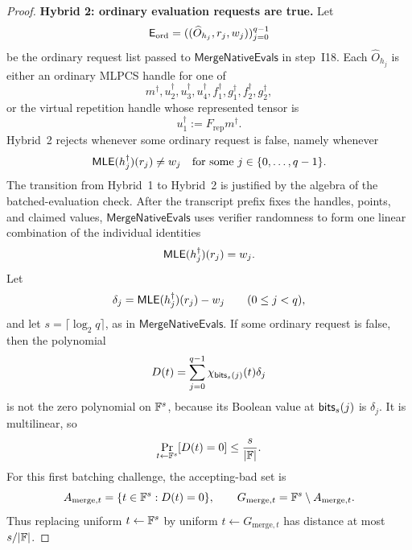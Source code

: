 \begin{proof}
\smallskip\noindent\textbf{Hybrid 2: ordinary evaluation requests are true.}
Let
\[
  \mathsf{E}_{\mathrm{ord}}
  =
  ((\widehat O_{h_j},r_j,w_j))_{j=0}^{q-1}
\]
be the ordinary request list passed to \(\mathsf{MergeNativeEvals}\) in
step~I18.  Each \(\widehat O_{h_j}\) is either an ordinary MLPCS handle for one
of
\[
  m^\dagger,u_2^\dagger,u_3^\dagger,u_4^\dagger,
  f_1^\dagger,g_1^\dagger,f_2^\dagger,g_2^\dagger,
\]
or the virtual repetition handle whose represented tensor is
\[
  u_1^\dagger:=F_{\mathrm{rep}}m^\dagger.
\]
Hybrid~2 rejects whenever some ordinary request is false, namely whenever
\[
  \mathsf{MLE}(h_j^\dagger)(r_j)\ne w_j
  \quad\text{for some }j\in\{0,\ldots,q-1\}.
\]
The transition from Hybrid~1 to Hybrid~2 is justified by the algebra of the
batched-evaluation check.  After the transcript prefix fixes the handles,
points, and claimed values, \(\mathsf{MergeNativeEvals}\) uses verifier
randomness to form one linear combination of the individual identities
\[
  \mathsf{MLE}(h_j^\dagger)(r_j)=w_j.
\]
Let
\[
  \delta_j=\mathsf{MLE}(h_j^\dagger)(r_j)-w_j
  \qquad(0\le j<q),
\]
and let \(s=\lceil\log_2 q\rceil\), as in
\(\mathsf{MergeNativeEvals}\).  If some ordinary request is false, then the
polynomial
\[
  D(t)=\sum_{j=0}^{q-1}\chi_{\mathsf{bits}_s(j)}(t)\delta_j
\]
is not the zero polynomial on \(\mathbb{F}^s\), because its Boolean value at
\(\mathsf{bits}_s(j)\) is \(\delta_j\).  It is multilinear, so
\[
  \Pr_{t\leftarrow\mathbb{F}^s}[D(t)=0]\le \frac{s}{|\mathbb{F}|}.
\]
For this first batching challenge, the accepting-bad set is
\[
  A_{\mathrm{merge},t}
  =
  \{t\in\mathbb{F}^s:D(t)=0\},
  \qquad
  G_{\mathrm{merge},t}
  =
  \mathbb{F}^s\setminus A_{\mathrm{merge},t}.
\]
Thus replacing uniform \(t\leftarrow\mathbb{F}^s\) by uniform
\(t\leftarrow G_{\mathrm{merge},t}\) has distance at most \(s/|\mathbb{F}|\).


\end{proof}
